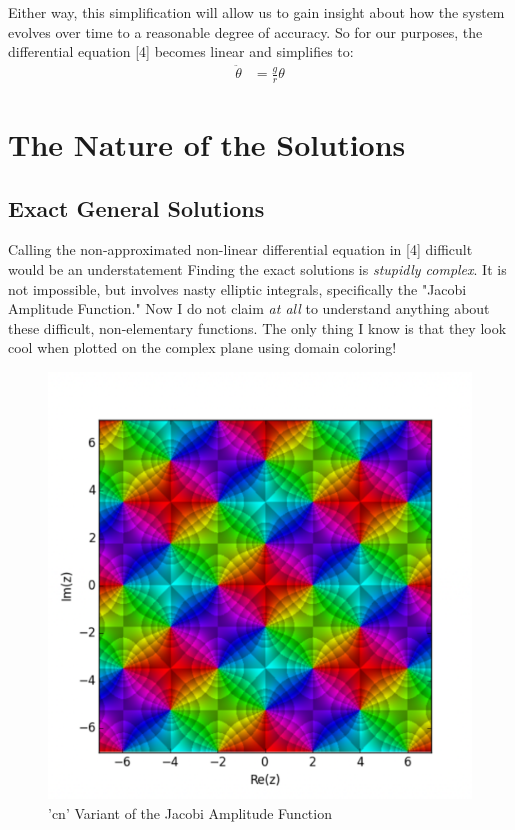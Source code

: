 \documentclass[11pt,a4paper]{article}
\begin{document}
Either way,  this simplification will allow us to gain insight about how the system evolves over time to a reasonable degree of accuracy.  So for our purposes,  the differential equation [4] becomes linear and simplifies to:
\begin{align}
\ddot{\theta} &= \frac{g}{r}\theta
\end{align}

\section{The Nature of the Solutions}

\subsection{Exact General Solutions}

Calling the non-approximated non-linear differential equation in [4] difficult would be an understatement  Finding the exact solutions is \textit{stupidly complex}.  It is not impossible,  but involves nasty elliptic integrals,  specifically the "Jacobi Amplitude Function." Now I do not claim \textit{at all} to understand anything about these difficult,  non-elementary functions. 
The only thing I know is that they look cool when plotted on the complex plane using domain coloring!

\begin{figure}[h]
\begin{center}
\includegraphics[scale=.4]{cn.png} 
\caption{'cn' Variant of the Jacobi Amplitude Function}
\end{center}
\end{figure}
\end{document}
